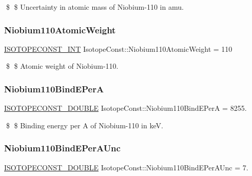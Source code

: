 \$ \$ Uncertainty in atomic mass of Niobium-\/110 in amu. \mbox{\label{group___isotope_const-_niobium-_nb110_ga833ca85e738501552e7809d00230ecc8}} 
\subsubsection{\texorpdfstring{Niobium110\+Atomic\+Weight}{Niobium110AtomicWeight}}
{\footnotesize\ttfamily \mbox{\hyperlink{group___isotope_const-_macros_ga5f18360b3e99483a35c32d789e62621c}{I\+S\+O\+T\+O\+P\+E\+C\+O\+N\+S\+T\+\_\+\+I\+NT}} Isotope\+Const\+::\+Niobium110\+Atomic\+Weight = 110}

\$ \$ Atomic weight of Niobium-\/110. \mbox{\label{group___isotope_const-_niobium-_nb110_ga6cbd270b60222886b385df2daee642e2}} 
\subsubsection{\texorpdfstring{Niobium110\+Bind\+E\+PerA}{Niobium110BindEPerA}}
{\footnotesize\ttfamily \mbox{\hyperlink{group___isotope_const-_macros_ga8f45a7272ce02c0b4c65c44636ed719a}{I\+S\+O\+T\+O\+P\+E\+C\+O\+N\+S\+T\+\_\+\+D\+O\+U\+B\+LE}} Isotope\+Const\+::\+Niobium110\+Bind\+E\+PerA = 8255.}

\$ \$ Binding energy per A of Niobium-\/110 in keV. \mbox{\label{group___isotope_const-_niobium-_nb110_ga746330f1abd2f22d4bd451154480a9da}} 
\subsubsection{\texorpdfstring{Niobium110\+Bind\+E\+Per\+A\+Unc}{Niobium110BindEPerAUnc}}
{\footnotesize\ttfamily \mbox{\hyperlink{group___isotope_const-_macros_ga8f45a7272ce02c0b4c65c44636ed719a}{I\+S\+O\+T\+O\+P\+E\+C\+O\+N\+S\+T\+\_\+\+D\+O\+U\+B\+LE}} Isotope\+Const\+::\+Niobium110\+Bind\+E\+Per\+A\+Unc = 7.}

